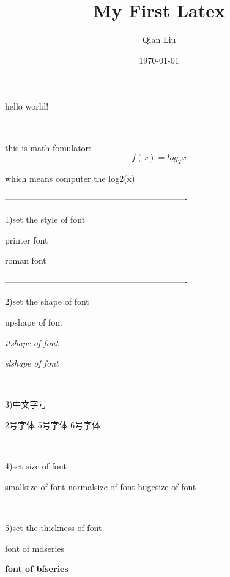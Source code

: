 \documentclass[UTF8]{ctexart}
\title{My First Latex}
\author{Qian Liu}
\date{\today}
\begin{document}
\maketitle
hello world!

----------------------------------------------------------------

this is math fomulator:$$f(x)=log_2 x$$ %

which means computer the log2(x)

----------------------------------------------------------------

1)set the style of font

{\ttfamily printer font}

{\rmfamily roman font}

----------------------------------------------------------------

2)set the shape of font

{\upshape upshape of font}

{\itshape itshape of font}

{\slshape slshape of font}

----------------------------------------------------------------

3)中文字号

{ 2号字体}
{ 5号字体}
{ 6号字体}

----------------------------------------------------------------

4)set size of font

{\small smallsize of font}
{\normalsize normalsize of font}
{\huge hugesize of font}

----------------------------------------------------------------

5)set the thickness of font

{\mdseries font of mdseries }

{\bfseries font of bfseries}
\end{document}
